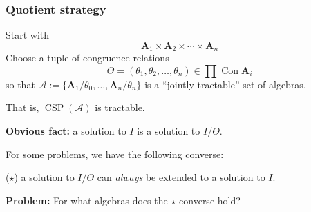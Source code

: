 \documentclass[10pt,xcolor=dvipsnames%
   ]{beamer}
\DeclareMathOperator{\Con}{Con}
\DeclareMathOperator{\CSP}{CSP}
\renewcommand{\.}{\cdot}
\newcommand{\sA}{\ensuremath{\mathcal{A}}}
\newcommand{\bA}{\ensuremath{\mathbf{A}}}
\begin{document}
\begin{frame}
    \frametitle{Quotient strategy}
  Start with
  \[
  \bA_1 \times \bA_2 \times \cdots \times \bA_n
  \]
  Choose a tuple of congruence relations
  \[
  \Theta = (\theta_1, \theta_2,  \dots, \theta_n) \in \prod \Con \bA_i
  \]
  so that $\sA := \{\bA_1/\theta_0, \dots, \bA_n/\theta_n\}$
  is a ``jointly tractable'' set of algebras.

  That is, $\CSP(\sA)$ is tractable.

  {\bf Obvious fact:} a solution to $I$ is a solution to $I/\Theta$.

  For some problems, we have the following converse:

  ({\large $\star$}) a solution to $I/\Theta$ can
  \emph{always} be extended to a solution to $I$. 

  {\bf Problem:} For what algebras does the {\large $\star$}-converse hold?
\end{frame}
\end{document}
